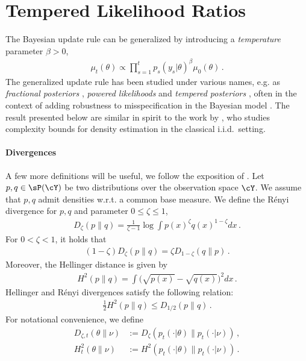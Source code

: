 \section{Tempered Likelihood Ratios}\label{sec:tempered}

The Bayesian update rule can be generalized by introducing a \emph{temperature} parameter $\beta > 0$,
\begin{align*}
    \mu_t(\theta) \propto \prod_{s=1}^t p_s(y_s|\theta)^\beta \mu_0(\theta) \,.
\end{align*}
The generalized update rule has been studied under various names, e.g. as \emph{fractional posteriors} \citep{bhattacharya2019bayesian}, \emph{powered likelihoods} \citet{holmes2017assigning} and \emph{tempered posteriors} \citep{alquier2020concentration}, often in the context of adding robustness to misspecification in the Bayesian model \citep{grunwald2012safe}. The result presented below are similar in spirit to the work by \citet{zhang2006varepsilon}, who studies complexity bounds for density estimation in the classical i.i.d.~setting.

\paragraph{Divergences} A few more definitions will be useful, we follow the exposition of \citet{van2014renyi}. Let $p,q \in \sP(\cY)$ be two distributions over the observation space $\cY$. We assume that $p,q$ admit densities w.r.t. a common base measure. We define the Rényi divergence for  $p,q$ and parameter $0 \leq \zeta \leq 1$,
\begin{align*}
    D_\zeta(p\|q) = \frac{1}{\zeta - 1} \log \int p(x)^{\zeta} q(x)^{1- \zeta} dx \,.
\end{align*}
For $0< \zeta < 1$, it holds that
\begin{align*}
   (1-\zeta)  D_\zeta(p\|q) = \zeta D_{1-\zeta}(q\|p)\,.
\end{align*}
Moreover, the Hellinger distance is given by 
\begin{align*}
    H^2(p\|q) = \int \big(\sqrt{p(x)} - \sqrt{q(x)}\big)^2 dx\,.
\end{align*}
Hellinger and Rényi divergences satisfy the following relation:
\begin{align*}
    \frac{1}{2} H^2(p\|q) \leq D_{1/2}(p\|q)\,.
\end{align*}
For notational convenience, we define
\begin{align*}
    D_{\zeta,t}(\theta\|\nu) &:= D_\zeta(p_t(\cdot|\theta)\|p_t(\cdot|\nu)) \,,\\
    H^2_t(\theta\|\nu) &:= H^2(p_t(\cdot|\theta)\|p_t(\cdot|\nu)) \,.\\
\end{align*}

